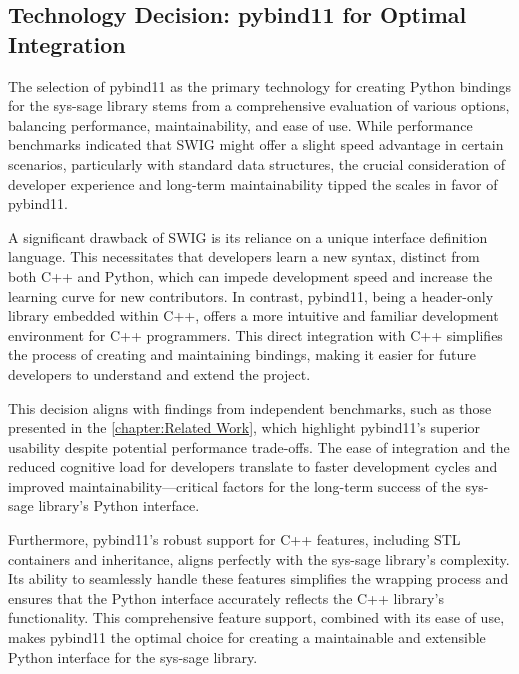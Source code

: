 \subsection{Technology Decision: pybind11 for Optimal Integration}

The selection of pybind11 as the primary technology for creating Python bindings for the sys-sage library stems from a comprehensive evaluation of various options, balancing performance, maintainability, and ease of use. While performance benchmarks indicated that SWIG might offer a slight speed advantage in certain scenarios, particularly with standard data structures, the crucial consideration of developer experience and long-term maintainability tipped the scales in favor of pybind11.

A significant drawback of SWIG is its reliance on a unique interface definition language. This necessitates that developers learn a new syntax, distinct from both C++ and Python, which can impede development speed and increase the learning curve for new contributors. In contrast, pybind11, being a header-only library embedded within C++, offers a more intuitive and familiar development environment for C++ programmers. This direct integration with C++ simplifies the process of creating and maintaining bindings, making it easier for future developers to understand and extend the project.

This decision aligns with findings from independent benchmarks, such as those presented in the \autoref{chapter:Related Work}, which highlight pybind11's superior usability despite potential performance trade-offs. The ease of integration and the reduced cognitive load for developers translate to faster development cycles and improved maintainability—critical factors for the long-term success of the sys-sage library's Python interface.

Furthermore, pybind11's robust support for C++ features, including \ac{STL} containers and inheritance, aligns perfectly with the sys-sage library's complexity. Its ability to seamlessly handle these features simplifies the wrapping process and ensures that the Python interface accurately reflects the C++ library's functionality. This comprehensive feature support, combined with its ease of use, makes pybind11 the optimal choice for creating a maintainable and extensible Python interface for the sys-sage library.